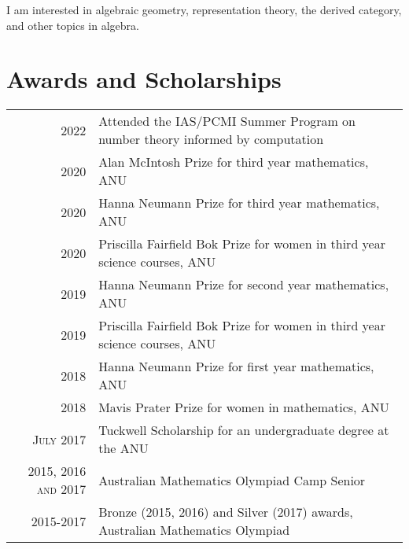 \documentclass[a4paper,10pt]{article} %
\begin{document}
I am interested in algebraic geometry, representation theory, the derived category, and other topics in algebra.


\section{Awards and Scholarships}

\begin{tabular}{rl}

2022 & Attended the IAS/PCMI Summer Program \footnotesize on number theory informed by computation\\

2020 & Alan McIntosh Prize \footnotesize for third year mathematics, ANU \normalsize\\

2020 & Hanna Neumann Prize \footnotesize for third year mathematics, ANU \normalsize\\

2020 & Priscilla Fairfield Bok Prize \footnotesize for women in third year science courses, ANU \normalsize\\

2019 & Hanna Neumann Prize \footnotesize for second year mathematics, ANU \normalsize\\

2019 & Priscilla Fairfield Bok Prize \footnotesize for women in third year science courses, ANU \normalsize\\

2018 & Hanna Neumann Prize \footnotesize for first year mathematics, ANU \normalsize\\

2018 & Mavis Prater Prize \footnotesize for women in mathematics, ANU \normalsize\\

\textsc{July} 2017 & Tuckwell Scholarship \footnotesize for an undergraduate degree at the ANU\\

2015, 2016 \textsc{and} 2017 & Australian Mathematics Olympiad Camp Senior \footnotesize \normalsize\\

2015-2017 & Bronze (2015, 2016) and Silver (2017) awards, Australian Mathematics Olympiad\footnotesize \normalsize\\

\end{tabular}
\end{document}
